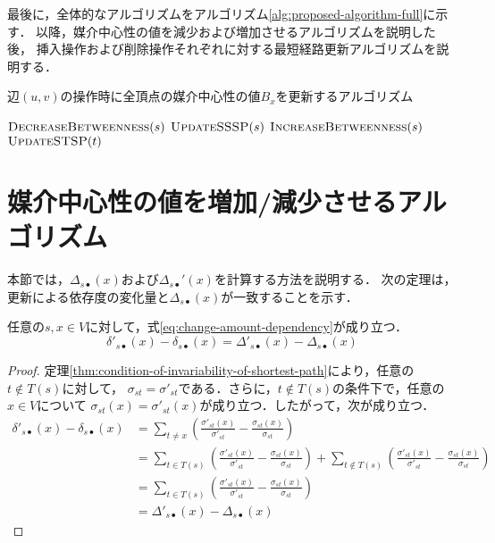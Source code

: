 最後に，全体的なアルゴリズムをアルゴリズム\ref{alg:proposed-algorithm-full}に示す．
以降，媒介中心性の値を減少および増加させるアルゴリズムを説明した後，
挿入操作および削除操作それぞれに対する最短経路更新アルゴリズムを説明する．

\begin{algorithm}[tb]
  \caption{辺$(u,v)$の操作時に全頂点の媒介中心性の値$B_x$を更新するアルゴリズム}
  \label{alg:proposed-algorithm-full}
  \begin{algorithmic}[1]\small
    \State $\textproc{DecreaseBetweenness}(s)$
    \State $\textproc{UpdateSSSP}(s)$
    \State $\textproc{IncreaseBetweenness}(s)$
    \EndFor
    \State $\textproc{UpdateSTSP}(t)$
    \EndFor
    \EndProcedure
  \end{algorithmic}
\end{algorithm}

\section{媒介中心性の値を増加/減少させるアルゴリズム}
\label{sect:update-betweenness}

本節では，$\Delta_{s\bullet}(x)$および$\Delta_{s\bullet}'(x)$を計算する方法を説明する．
次の定理は，更新による依存度の変化量と$\Delta_{s\bullet}(x)$が一致することを示す．
\begin{theorem}
  任意の$s,x\in V$に対して，式\eqref{eq:change-amount-dependency}が成り立つ．
  \begin{equation}
    \delta'_{s\bullet}(x)-\delta_{s\bullet}(x)=\Delta'_{s\bullet}(x)-\Delta_{s\bullet}(x)
    \label{eq:change-amount-dependency}
  \end{equation}
\end{theorem}
\begin{proof}
  定理\ref{thm:condition-of-invariability-of-shortest-path}により，任意の$t\notin T(s)$に対して，
  $\sigma_{st}=\sigma'_{st}$である．さらに，$t\notin T(s)$の条件下で，任意の$x\in V$について
  $\sigma_{st}(x)=\sigma'_{st}(x)$が成り立つ．したがって，次が成り立つ．
  \begin{equation*}
    \begin{aligned}
      \delta'_{s\bullet}(x)-\delta_{s\bullet}(x)
      &=\sum_{t\neq x}\left(\frac{\sigma'_{st}(x)}{\sigma'_{st}}-\frac{\sigma_{st}(x)}{\sigma_{st}}\right) \\
      &=\sum_{t\in T(s)}\left(\frac{\sigma'_{st}(x)}{\sigma'_{st}}-\frac{\sigma_{st}(x)}{\sigma_{st}}\right)
      +\sum_{t\notin T(s)}\left(\frac{\sigma'_{st}(x)}{\sigma'_{st}}-\frac{\sigma_{st}(x)}{\sigma_{st}}\right) \\
      &=\sum_{t\in T(s)}\left(\frac{\sigma'_{st}(x)}{\sigma'_{st}}-\frac{\sigma_{st}(x)}{\sigma_{st}}\right) \\
      &=\Delta'_{s\bullet}(x)-\Delta_{s\bullet}(x)
    \end{aligned}
  \end{equation*}
\end{proof}

